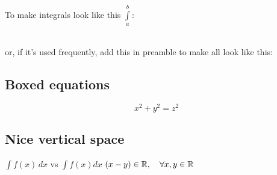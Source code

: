 To make integrals look like this $\int\limits_a^b $:

\\
or, if it's used frequently, add this in preamble to make all look like this:\\
\code{\usepackage[intlimits]{amsmath}}

\subsection*{Boxed equations}

\begin{example}
\begin{equation}
 \boxed{x^2+y^2 = z^2}
\end{equation}
\end{example}

\begin{example}

\end{example}

\subsection*{Nice vertical space}
\begin{example}
\centering
$\int f(x)\,dx$ vs $\int f(x) dx$ 
$(x - y) \in \mathbb{R}, \quad \forall x, y \in \mathbb{R}$
\end{example}


